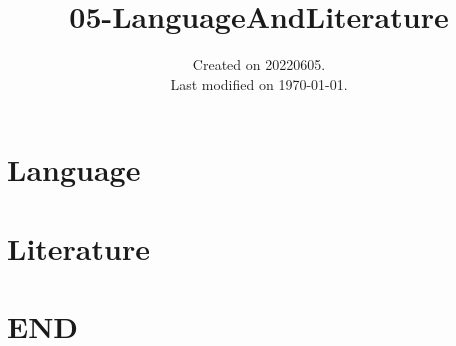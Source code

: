 \documentclass[UTF8]{../RepresentationUniverse}
\begin{document}
\title{05-LanguageAndLiterature}
\date{Created on 20220605.\\   Last modified on \today.}
\maketitle
\tableofcontents

\chapter{Language}%



\chapter{Literature}%


\chapter{END}
\end{document}
